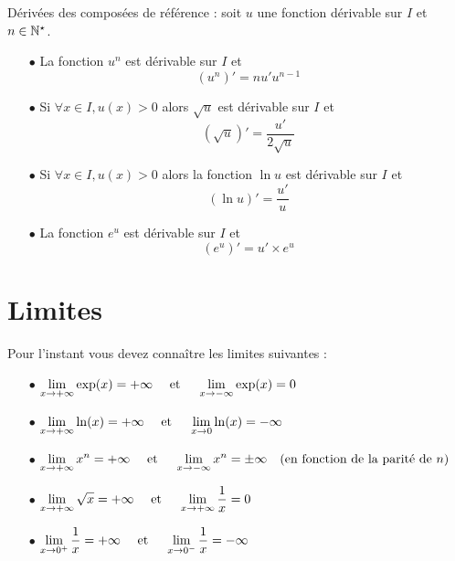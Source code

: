 \documentclass[a4paper, 11pt]{article}
\begin{document}
\begin{exemples} D\'eriv\'ees des compos\'ees de r\'ef\'erence : soit $u$ une fonction d\'erivable sur $I$ et $n\in\mathbb{N}^{\star}$. 
\begin{itemize}
\item[$\bullet$] La fonction $u^n$ est d\'erivable sur $I$ et $$(u^n)'=n u' u^{n-1}$$
\item[$\bullet$] Si $\forall x \in I, u(x)>0 $ alors $\sqrt{u}$ est d\'erivable sur $I$ et $$(\sqrt{u})'=\frac{u'}{2\sqrt{u}} $$ 
\item[$\bullet$] Si $\forall x \in I,  u(x)>0 $ alors la fonction $\ln{{u}}$ est d\'erivable sur $I$ et $$(\ln u)'= \frac{u'}{u}$$ 
\item[$\bullet$] La fonction $e^{u}$ est d\'erivable sur $I$ et $$(e^u)'=u' \times e^u$$ 
\end{itemize}
\end{exemples}
\vspace{-1cm}
\section{Limites}

Pour l'instant vous devez connaître les limites suivantes : 
\begin{itemize}
    \item[$\bullet$]$ \displaystyle \lim_{x\rightarrow +\infty} \exp(x) = +\infty\quad \text{ et } \quad \lim_{x\rightarrow -\infty} \exp(x) = 0$ 
    \item[$\bullet$]$ \displaystyle \lim_{x\rightarrow +\infty} \ln(x) = +\infty\quad \text{ et } \quad \lim_{x\rightarrow0} \ln(x) = -\infty$
     \item[$\bullet$]$ \displaystyle\lim_{x\rightarrow +\infty} x^n= +\infty\quad \text{ et } \quad \lim_{x\rightarrow -\infty} x^n = \pm \infty \quad ( \text{en fonction de la parité de $n$})$
\item[$\bullet$]$ \displaystyle\lim_{x\rightarrow +\infty} \sqrt{x}= +\infty \quad \text{ et } \quad  \displaystyle\lim_{x\rightarrow +\infty} \frac{1}{x}=0$
      \item[$\bullet$]$ \displaystyle\lim_{x\rightarrow 0^+} \frac{1}{x}=+\infty \quad \text{ et } \quad  \displaystyle\lim_{x\rightarrow 0^-} \frac{1}{x}=-\infty$
            
\end{itemize}
\end{document}

